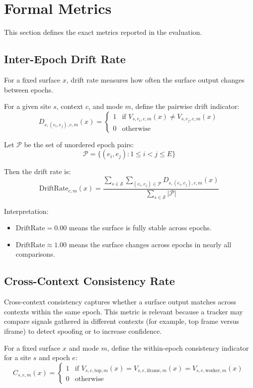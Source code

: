 \documentclass[11pt]{report}
\begin{document}
\section{Formal Metrics}

This section defines the exact metrics reported in the evaluation.

\subsection{Inter-Epoch Drift Rate}

For a fixed surface $x$, drift rate measures how often the surface output changes between epochs.

For a given site $s$, context $c$, and mode $m$, define the pairwise drift indicator:
\[
D_{s,(e_i,e_j),c,m}(x) =
\begin{cases}
1 & \text{if } V_{s,e_i,c,m}(x) \ne V_{s,e_j,c,m}(x) \\
0 & \text{otherwise}
\end{cases}
\]

Let $\mathcal{P}$ be the set of unordered epoch pairs:
\[
\mathcal{P} = \{(e_i,e_j) : 1 \le i < j \le E\}
\]

Then the drift rate is:
\[
\text{DriftRate}_{c,m}(x) =
\frac{\sum_{s \in \mathcal{S}} \sum_{(e_i,e_j)\in\mathcal{P}} D_{s,(e_i,e_j),c,m}(x)}
{\sum_{s \in \mathcal{S}} |\mathcal{P}|}
\]

Interpretation:
\begin{itemize}
    \item $\text{DriftRate}=0.00$ means the surface is fully stable across epochs.
    \item $\text{DriftRate}\approx 1.00$ means the surface changes across epochs in nearly all comparisons.
\end{itemize}

\subsection{Cross-Context Consistency Rate}

Cross-context consistency captures whether a surface output matches across contexts within the same epoch. This metric is relevant because a tracker may compare signals gathered in different contexts (for example, top frame versus iframe) to detect spoofing or to increase confidence.

For a fixed surface $x$ and mode $m$, define the within-epoch consistency indicator for a site $s$ and epoch $e$:
\[
C_{s,e,m}(x) =
\begin{cases}
1 & \text{if } V_{s,e,\text{top},m}(x) = V_{s,e,\text{iframe},m}(x) = V_{s,e,\text{worker},m}(x) \\
0 & \text{otherwise}
\end{cases}
\]
\end{document}
